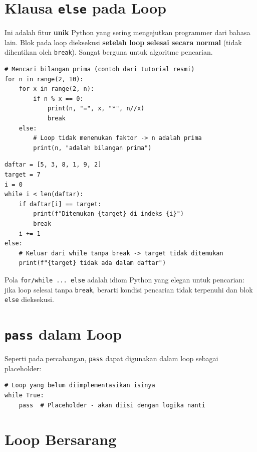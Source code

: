 ﻿\documentclass[../main.tex]{subfiles}
\begin{document}
\section{Klausa \texttt{else} pada Loop}

Ini adalah fitur \textbf{unik} Python yang sering mengejutkan programmer dari bahasa lain. Blok  pada loop dieksekusi \textbf{setelah loop selesai secara normal} (tidak dihentikan oleh \texttt{break}). Sangat berguna untuk algoritme pencarian.

\begin{lstlisting}[caption=else pada loop for (Tutorial Python ss4.5)]
# Mencari bilangan prima (contoh dari tutorial resmi)
for n in range(2, 10):
    for x in range(2, n):
        if n % x == 0:
            print(n, "=", x, "*", n//x)
            break
    else:
        # Loop tidak menemukan faktor -> n adalah prima
        print(n, "adalah bilangan prima")
\end{lstlisting}

\begin{lstlisting}[caption=else pada loop while: pencarian nilai]
daftar = [5, 3, 8, 1, 9, 2]
target = 7
i = 0
while i < len(daftar):
    if daftar[i] == target:
        print(f"Ditemukan {target} di indeks {i}")
        break
    i += 1
else:
    # Keluar dari while tanpa break -> target tidak ditemukan
    print(f"{target} tidak ada dalam daftar")
\end{lstlisting}

\begin{konsep}
Pola \texttt{for/while ... else} adalah idiom Python yang elegan untuk pencarian: jika loop selesai tanpa \texttt{break}, berarti kondisi pencarian tidak terpenuhi dan blok \texttt{else} dieksekusi.
\end{konsep}

\section{\texttt{pass} dalam Loop}

Seperti pada percabangan, \texttt{pass} dapat digunakan dalam loop sebagai placeholder:

\begin{lstlisting}[caption=pass dalam loop]
# Loop yang belum diimplementasikan isinya
while True:
    pass  # Placeholder - akan diisi dengan logika nanti
\end{lstlisting}

\section{Loop Bersarang}
\end{document}

